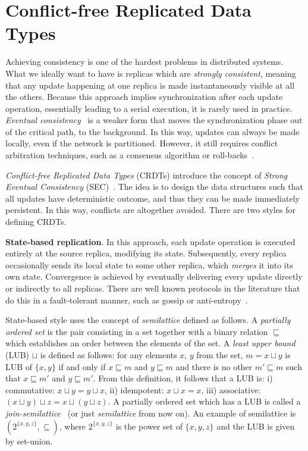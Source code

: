 \section{Conflict-free Replicated Data Types}
\label{sec:crdts}

Achieving consistency is one of the hardest problems in distributed
systems. What we ideally want to have is replicas which are \textit{strongly
consistent}, meaning that any update happening at one replica is made
instantaneously visible at all the others. Because this approach implies
synchronization after each update operation, essentially leading to a serial
execution, it is rarely used in practice. \textit{Eventual
consistency}~\cite{DBLP:journals/queue/Vogels08a,Saito:2005:OR:1057977.1057980}
is a weaker form that moves the synchronization phase out of the critical path,
to the background. In this way, updates can always be made locally, even if the
network is partitioned. However, it still requires conflict arbitration
techniques, such as a consensus algorithm or
roll-backs~\cite{Terry:1995:MUC:224056.224070}.

\textit{Conflict-free Replicated Data Types} (CRDTs) introduce the concept of
\textit{Strong Eventual Consistency}
(SEC)~\cite{Shapiro:2011:CRD:2050613.2050642}. The idea is to design the data
structures such that all updates have deterministic outcome, and thus they can 
be made immediately persistent. In this way, conflicts are altogether avoided.
There are two styles for defining CRDTs. 

\textbf{State-based replication}. In this approach, each update operation is
executed entirely at the source replica, modifying its state. Subsequently,
every replica occasionally sends its local state to some other replica, which
\textit{merges} it into its own state. Convergence is achieved by eventually
delivering every update directly or indirectly to all replicas. There are well
known protocols in the literature that do this in a fault-tolerant manner, such
as gossip or anti-entropy~\cite{Demers:1987:EAR:41840.41841,
Petersen:1997:FUP:268998.266711}.

State-based style uses the concept of \textit{semilattice} defined as follows. A
\textit{partially ordered set} is the pair consisting in a set together with a
binary relation $\sqsubseteq$ which establishes an order between the elements of
the set. A \textit{least upper bound} (LUB) $\sqcup$ is defined as follows: for
any elements $x$, $y$ from the set, $m = x \sqcup y$ is LUB of $\{x, y\}$ if and
only if $x \sqsubseteq m$ and $y \sqsubseteq m$ and there is no other $m'
\sqsubseteq m$ such that $x \sqsubseteq m'$ and $y \sqsubseteq m'$. From this
definition, it follows that a LUB is: i) commutative: $x \sqcup y = y \sqcup x$,
ii) idempotent: $x \sqcup x = x$, iii) associative: $(x \sqcup y) \sqcup z = x
\sqcup (y \sqcup z)$. A partially ordered set which has a LUB is called a
\textit{join-semilattice}~\cite{semilattice} (or just \textit{semilattice} from
now on). An example of semilattice is $(2^{\{x, y, z\}}, \subseteq)$, where
$2^{\{x, y, z\}}$ is the power set of $\{x, y, z\}$ and the LUB is given by
set-union.

